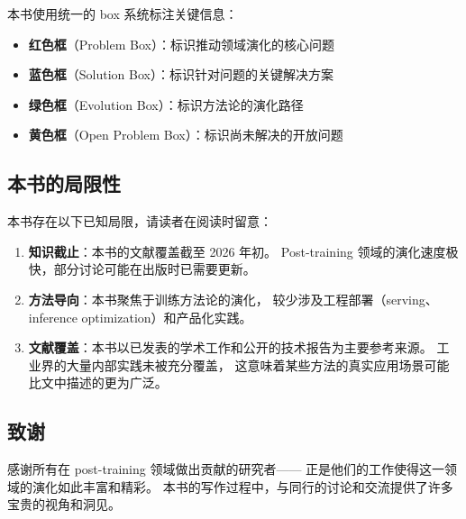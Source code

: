 \noindent
本书使用统一的 box 系统标注关键信息：
\begin{itemize}[leftmargin=2em]
  \item \textbf{\color{red!60}红色框}（Problem Box）：标识推动领域演化的核心问题
  \item \textbf{\color{blue!60}蓝色框}（Solution Box）：标识针对问题的关键解决方案
  \item \textbf{\color{green!60!black}绿色框}（Evolution Box）：标识方法论的演化路径
  \item \textbf{\color{yellow!70!black}黄色框}（Open Problem Box）：标识尚未解决的开放问题
\end{itemize}

\subsection*{本书的局限性}

本书存在以下已知局限，请读者在阅读时留意：

\begin{enumerate}[leftmargin=2em]
  \item \textbf{知识截止}：本书的文献覆盖截至 2026 年初。
    Post-training 领域的演化速度极快，部分讨论可能在出版时已需要更新。

  \item \textbf{方法导向}：本书聚焦于训练方法论的演化，
    较少涉及工程部署（serving、inference optimization）和产品化实践。

  \item \textbf{文献覆盖}：本书以已发表的学术工作和公开的技术报告为主要参考来源。
    工业界的大量内部实践未被充分覆盖，
    这意味着某些方法的真实应用场景可能比文中描述的更为广泛。
\end{enumerate}

\subsection*{致谢}

感谢所有在 post-training 领域做出贡献的研究者——
正是他们的工作使得这一领域的演化如此丰富和精彩。
本书的写作过程中，与同行的讨论和交流提供了许多宝贵的视角和洞见。
